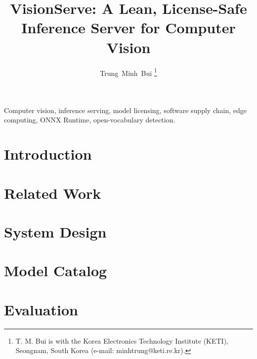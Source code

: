 \documentclass[journal]{IEEEtran}
\title{VisionServe: A Lean, License-Safe Inference Server for Computer Vision}
\author{Trung~Minh~Bui%
  \thanks{T. M. Bui is with the Korea Electronics Technology Institute (KETI),
  Seongnam, South Korea (e-mail: minhtrung@keti.re.kr).}}
\begin{document}
\maketitle

\begin{abstract}

\end{abstract}

\begin{IEEEkeywords}
Computer vision, inference serving, model licensing, software supply chain, edge
computing, ONNX Runtime, open-vocabulary detection.
\end{IEEEkeywords}

\IEEEpeerreviewmaketitle

\section{Introduction}
\label{sec:intro}


\section{Related Work}
\label{sec:related}


\section{System Design}
\label{sec:design}


\section{Model Catalog}
\label{sec:catalog}


\section{Evaluation}
\label{sec:eval}


\end{document}
